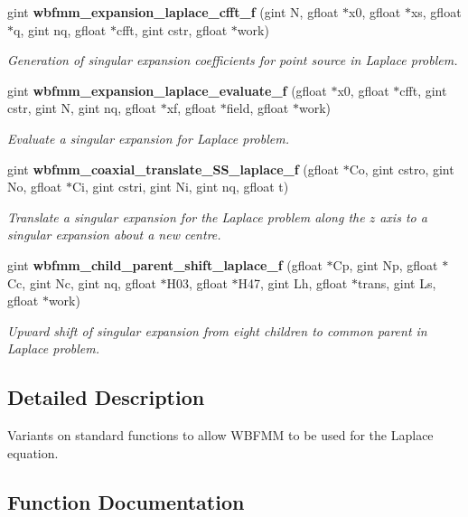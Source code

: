 \begin{DoxyCompactItemize}
gint {\bf wbfmm\+\_\+expansion\+\_\+laplace\+\_\+cfft\+\_\+f} (gint N, gfloat $\ast$x0, gfloat $\ast$xs, gfloat $\ast$q, gint nq, gfloat $\ast$cfft, gint cstr, gfloat $\ast$work)
\begin{DoxyCompactList}\small\item\em Generation of singular expansion coefficients for point source in Laplace problem. \end{DoxyCompactList}\item 
gint {\bf wbfmm\+\_\+expansion\+\_\+laplace\+\_\+evaluate\+\_\+f} (gfloat $\ast$x0, gfloat $\ast$cfft, gint cstr, gint N, gint nq, gfloat $\ast$xf, gfloat $\ast$field, gfloat $\ast$work)
\begin{DoxyCompactList}\small\item\em Evaluate a singular expansion for Laplace problem. \end{DoxyCompactList}\item 
gint {\bf wbfmm\+\_\+coaxial\+\_\+translate\+\_\+\+S\+S\+\_\+laplace\+\_\+f} (gfloat $\ast$Co, gint cstro, gint No, gfloat $\ast$Ci, gint cstri, gint Ni, gint nq, gfloat t)
\begin{DoxyCompactList}\small\item\em Translate a singular expansion for the Laplace problem along the $z$ axis to a singular expansion about a new centre. \end{DoxyCompactList}\item 
gint {\bf wbfmm\+\_\+child\+\_\+parent\+\_\+shift\+\_\+laplace\+\_\+f} (gfloat $\ast$Cp, gint Np, gfloat $\ast$Cc, gint Nc, gint nq, gfloat $\ast$H03, gfloat $\ast$H47, gint Lh, gfloat $\ast$trans, gint Ls, gfloat $\ast$work)
\begin{DoxyCompactList}\small\item\em Upward shift of singular expansion from eight children to common parent in Laplace problem. \end{DoxyCompactList}\end{DoxyCompactItemize}


\subsection{Detailed Description}
Variants on standard functions to allow W\+B\+F\+M\+M to be used for the Laplace equation. 



\subsection{Function Documentation}
